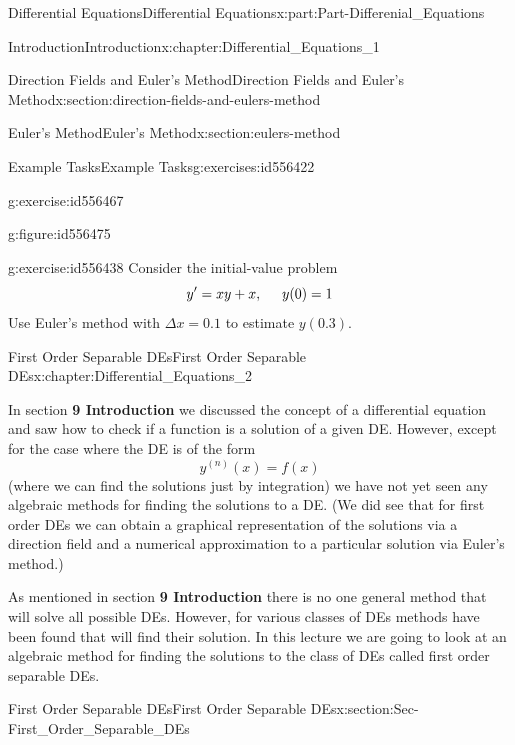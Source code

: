 \documentclass[oneside,10pt,]{book}
\newcommand{\terminology}[1]{\textbf{#1}}
\numberwithin{equation}{section}
\begin{document}
\begin{partptx}{Differential Equations}{}{Differential Equations}{}{}{x:part:Part-Differenial_Equations}
\begin{chapterptx}{Introduction}{}{Introduction}{}{}{x:chapter:Differential_Equations_1}
\begin{sectionptx}{Direction Fields and Euler's Method}{}{Direction Fields and Euler's Method}{}{}{x:section:direction-fields-and-eulers-method}
\begin{sectionptx}{Euler's Method}{}{Euler's Method}{}{}{x:section:eulers-method}
\begin{exercises-subsection-numberless}{Example Tasks}{}{Example Tasks}{}{}{g:exercises:id556422}
\begin{divisionexercise}{2}{}{}{g:exercise:id556467}
\begin{figureptx}{}{g:figure:id556475}{}
\tcblower
\end{figureptx}%
\end{divisionexercise}%
\begin{divisionexercise}{3}{}{}{g:exercise:id556438}%
Consider the initial-value problem%
\begin{equation*}
y'=xy+x, \hspace{5mm} y(0)=1
\end{equation*}
Use Euler’s method with \(\Delta x=0.1\) to estimate \(y(0.3)\).%
\end{divisionexercise}%
\end{exercises-subsection-numberless}
\end{sectionptx}
\end{sectionptx}
\end{chapterptx}
%
\typeout{************************************************}
\typeout{************************************************}
%
\begin{chapterptx}{First Order Separable DEs}{}{First Order Separable DEs}{}{}{x:chapter:Differential_Equations_2}
\begin{introduction}{}%
In section \terminology{9 Introduction} we discussed the concept of a differential equation and saw how to check if a function is a solution of a given DE. However, except for the case where the DE is of the form%
\begin{equation*}
y^{(n)}(x)=f(x)
\end{equation*}
(where we can find the solutions just by integration) we have not yet seen any algebraic methods for finding the solutions to a DE. (We did see that for first order DEs we can obtain a graphical representation of the solutions via a direction field and a numerical approximation to a particular solution via Euler’s method.)%
\par
As mentioned in section \terminology{9 Introduction} there is no one general method that will solve all possible DEs. However, for various classes of DEs methods have been found that will find their solution. In this lecture we are going to look at an algebraic method for finding the solutions to the class of DEs called first order separable DEs.%
\end{introduction}%
%
%
\typeout{************************************************}
\typeout{************************************************}
%
\begin{sectionptx}{First Order Separable DEs}{}{First Order Separable DEs}{}{}{x:section:Sec-First_Order_Separable_DEs}

\end{sectionptx}
\end{chapterptx}
\end{partptx}
\end{document}
